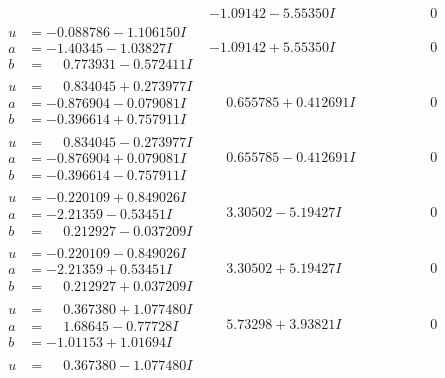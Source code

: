 \documentclass[1p]{elsarticle_modified}
\theoremstyle{definition}
\begin{document}
$$\begin{array}{c|c|c}
 & -1.09142 - 5.55350 I & \phantom{-0.000000 } 0 \\ \hline\begin{aligned}
u &= -0.088786 - 1.106150 I \\
a &= -1.40345 - 1.03827 I \\
b &= \phantom{-}0.773931 - 0.572411 I\end{aligned}
 & -1.09142 + 5.55350 I & \phantom{-0.000000 } 0 \\ \hline\begin{aligned}
u &= \phantom{-}0.834045 + 0.273977 I \\
a &= -0.876904 - 0.079081 I \\
b &= -0.396614 + 0.757911 I\end{aligned}
 & \phantom{-}0.655785 + 0.412691 I & \phantom{-0.000000 } 0 \\ \hline\begin{aligned}
u &= \phantom{-}0.834045 - 0.273977 I \\
a &= -0.876904 + 0.079081 I \\
b &= -0.396614 - 0.757911 I\end{aligned}
 & \phantom{-}0.655785 - 0.412691 I & \phantom{-0.000000 } 0 \\ \hline\begin{aligned}
u &= -0.220109 + 0.849026 I \\
a &= -2.21359 - 0.53451 I \\
b &= \phantom{-}0.212927 - 0.037209 I\end{aligned}
 & \phantom{-}3.30502 - 5.19427 I & \phantom{-0.000000 } 0 \\ \hline\begin{aligned}
u &= -0.220109 - 0.849026 I \\
a &= -2.21359 + 0.53451 I \\
b &= \phantom{-}0.212927 + 0.037209 I\end{aligned}
 & \phantom{-}3.30502 + 5.19427 I & \phantom{-0.000000 } 0 \\ \hline\begin{aligned}
u &= \phantom{-}0.367380 + 1.077480 I \\
a &= \phantom{-}1.68645 - 0.77728 I \\
b &= -1.01153 + 1.01694 I\end{aligned}
 & \phantom{-}5.73298 + 3.93821 I & \phantom{-0.000000 } 0 \\ \hline\begin{aligned}
u &= \phantom{-}0.367380 - 1.077480 I \\

\end{aligned}
\end{array}$$
\end{document}
